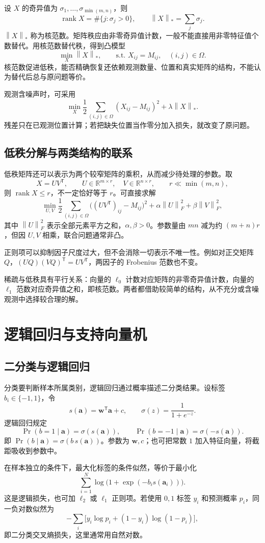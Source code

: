 \documentclass[UTF8,fontset=fandol,a4paper,12pt]{ctexart}
\newcommand{\R}{\mathbb R}
\newcommand{\rank}{\operatorname{rank}}
\newcommand{\va}{\boldsymbol a}
\newcommand{\vw}{\boldsymbol w}
\newcommand{\norm}[1]{\left\lVert#1\right\rVert}
\theoremstyle{definition}
\begin{document}
设 $X$ 的奇异值为 $\sigma_1,\ldots,\sigma_{\min(m,n)}$，则
\[
 \rank X=\#\{j:\sigma_j>0\},\qquad
 \norm{X}_*=\sum_j\sigma_j.
\]
$\norm{X}_*$ 称为核范数。矩阵秩应由非零奇异值计数，一般不能直接用非零特征值个数替代。用核范数替代秩，得到凸模型
\[
 \boxed{\min_X\norm{X}_*,\qquad
 \text{s.t. }X_{ij}=M_{ij},\quad(i,j)\in\Omega.}
\]
核范数促进低秩，能否精确恢复还依赖观测数量、位置和真实矩阵的结构，不能认为替代后总与原问题等价。

观测含噪声时，可采用
\[
 \min_X\frac12\sum_{(i,j)\in\Omega}(X_{ij}-M_{ij})^2
 +\lambda\norm{X}_*.
\]
残差只在已观测位置计算；若把缺失位置当作零分加入损失，就改变了原问题。

\subsection{低秩分解与两类结构的联系}
低秩矩阵还可以表示为两个较窄矩阵的乘积，从而减少待处理的参数。取
\[
 X=UV^{\mathsf T},\qquad U\in\R^{m\times r},\quad V\in\R^{n\times r},
 \qquad r\ll\min(m,n),
\]
则 $\rank X\le r$，不一定恰好等于 $r$。可直接求解
\[
 \min_{U,V}\frac12\sum_{(i,j)\in\Omega}
 \bigl((UV^{\mathsf T})_{ij}-M_{ij}\bigr)^2
 +\alpha\norm{U}_F^2+\beta\norm{V}_F^2,
\]
其中 $\norm{U}_F^2$ 表示全部元素平方之和，$\alpha,\beta>0$。参数量由 $mn$ 减为约 $(m+n)r$，但因 $U,V$ 相乘，联合问题通常非凸。

正则项可以抑制因子尺度过大，但不会消除一切表示不唯一性。例如对正交矩阵 $Q$，$(UQ)(VQ)^{\mathsf T}=UV^{\mathsf T}$，两因子的 Frobenius 范数也不变。

稀疏与低秩具有平行关系：向量的 $\ell_0$ 计数对应矩阵的非零奇异值计数，向量的 $\ell_1$ 范数对应奇异值之和，即核范数。两者都借助较简单的结构，从不充分或含噪观测中选择较合理的解。

\section{逻辑回归与支持向量机}
\subsection{二分类与逻辑回归}
分类要判断样本所属类别，逻辑回归通过概率描述二分类结果。设标签 $b_i\in\{-1,1\}$，令
\[
 s(\va)=\vw^{\mathsf T}\va+c,\qquad \sigma(z)=\frac1{1+e^{-z}}.
\]
逻辑回归规定
\[
 \Pr(b=1\mid\va)=\sigma(s(\va)),\qquad
 \Pr(b=-1\mid\va)=\sigma(-s(\va)).
\]
即 $\Pr(b\mid\va)=\sigma(b\,s(\va))$。参数为 $\vw,c$；也可把常数 $1$ 加入特征向量，将截距吸收到参数中。

在样本独立的条件下，最大化标签的条件似然，等价于最小化
\begin{equation}\label{eq:logistic}
 \boxed{\sum_{i=1}^N\log\bigl(1+\exp(-b_i s(\va_i))\bigr).}
\end{equation}
这是逻辑损失，也可加 $\ell_2$ 或 $\ell_1$ 正则项。若使用 $0,1$ 标签 $y_i$ 和预测概率 $p_i$，同一负对数似然为
\[
 -\sum_i\bigl[y_i\log p_i+(1-y_i)\log(1-p_i)\bigr],
\]
即二分类交叉熵损失，这里通常用自然对数。
\end{document}
